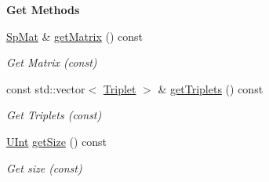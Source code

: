 \begin{Indent}{\bf Get Methods}\par
\begin{DoxyCompactItemize}
\item 
\hyperlink{namespaceFVCode3D_ac1032289d96638cf0ad6c52ef639095f}{Sp\+Mat} \& \hyperlink{classFVCode3D_1_1MatrixHandler_a149f6a64d6829c56b8f7ac3f2189e42c}{get\+Matrix} () const 
\begin{DoxyCompactList}\small\item\em Get Matrix (const) \end{DoxyCompactList}\item 
const std\+::vector$<$ \hyperlink{namespaceFVCode3D_a1d6853f6847ee83d6e823a500a8232fd}{Triplet} $>$ \& \hyperlink{classFVCode3D_1_1MatrixHandler_a770aed167dcbd639a242a309659a3457}{get\+Triplets} () const 
\begin{DoxyCompactList}\small\item\em Get Triplets (const) \end{DoxyCompactList}\item 
\hyperlink{namespaceFVCode3D_a4bf7e328c75d0fd504050d040ebe9eda}{U\+Int} \hyperlink{classFVCode3D_1_1MatrixHandler_a6e193ae089f9bdf258bfb581cf0dc753}{get\+Size} () const 
\begin{DoxyCompactList}\small\item\em Get size (const) \end{DoxyCompactList}\end{DoxyCompactItemize}
\end{Indent}
